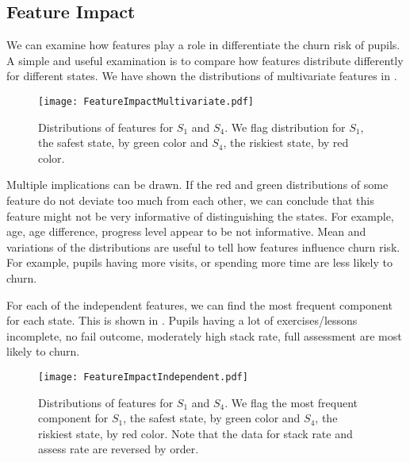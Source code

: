 \subsection{Feature Impact}

We can examine how features play a role in differentiate the churn risk of pupils. A simple and useful examination is to compare how features distribute differently for different states. We have shown the distributions of multivariate features in .

\begin{figure}[!h]
\centering
\texttt{[image: FeatureImpactMultivariate.pdf]}
\caption{Distributions of features for $S_1$ and $S_4$. We flag distribution for $S_1$, the safest state, by green color and $S_4$, the riskiest state, by red color.}
\label{fig:ftrImpMulti}
\end{figure}

Multiple implications can be drawn. If the red and green distributions of some feature do not deviate too much from each other, we can conclude that this feature might not be very informative of distinguishing the states. For example, age, age difference, progress level appear to be not informative. Mean and variations of the distributions are useful to tell how features influence churn risk. For example, pupils having more visits, or spending more time are less likely to churn. 

For each of the independent features, we can find the most frequent component for each state. This is shown in . Pupils having a lot of exercises/lessons incomplete, no fail outcome, moderately high stack rate, full assessment are most likely to churn.

\begin{figure}[!h]
\centering
\texttt{[image: FeatureImpactIndependent.pdf]}
\caption{Distributions of features for $S_1$ and $S_4$. We flag the most frequent component for $S_1$, the safest state, by green color and $S_4$, the riskiest state, by red color. Note that the data for stack rate and assess rate are reversed by order.}
\label{fig:ftrImpIndep}
\end{figure}

